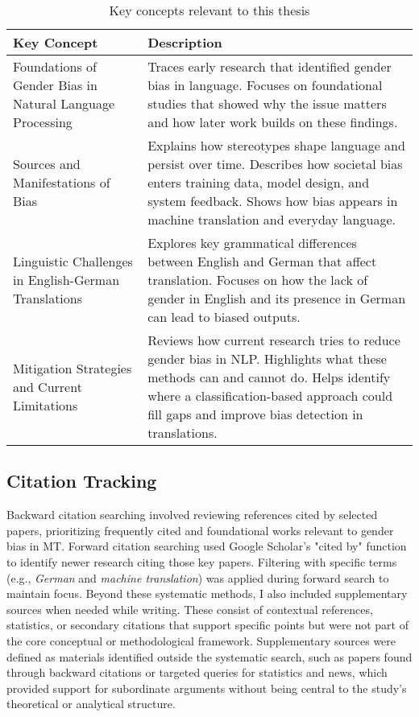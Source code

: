 \renewcommand{\arraystretch}{1.3}
\begin{table}[ht!]
\centering
\begin{tabularx}{\textwidth}{>{\raggedright\arraybackslash}p{6.5cm}X}
\toprule
\textbf{Key Concept} & \textbf{Description} \\
\midrule

Foundations of Gender Bias in Natural Language Processing & Traces early research that identified gender bias in language. Focuses on foundational studies that showed why the issue matters and how later work builds on these findings. \\

Sources and Manifestations of Bias & Explains how stereotypes shape language and persist over time. Describes how societal bias enters training data, model design, and system feedback. Shows how bias appears in machine translation and everyday language. \\

Linguistic Challenges in English-German Translations & Explores key grammatical differences between English and German that affect translation. Focuses on how the lack of gender in English and its presence in German can lead to biased outputs. \\

Mitigation Strategies and Current Limitations & Reviews how current research tries to reduce gender bias in NLP. Highlights what these methods can and cannot do. Helps identify where a classification-based approach could fill gaps and improve bias detection in translations. \\

\bottomrule
\end{tabularx}
\caption{Key concepts relevant to this thesis}
\label{tab:key-concepts}
\end{table}


\subsection{Citation Tracking}
Backward citation searching involved reviewing references cited by selected papers, prioritizing frequently cited and foundational works relevant to gender bias in MT. Forward citation searching used Google Scholar’s "cited by" function to identify newer research citing those key papers. Filtering with specific terms (e.g., \textit{German} and \textit{machine translation}) was applied during forward search to maintain focus. Beyond these systematic methods, I also included supplementary sources when needed while writing. These consist of contextual references, statistics, or secondary citations that support specific points but were not part of the core conceptual or methodological framework. Supplementary sources were defined as materials identified outside the systematic search, such as papers found through backward citations or targeted queries for statistics and news, which provided support for subordinate arguments without being central to the study’s theoretical or analytical structure.



